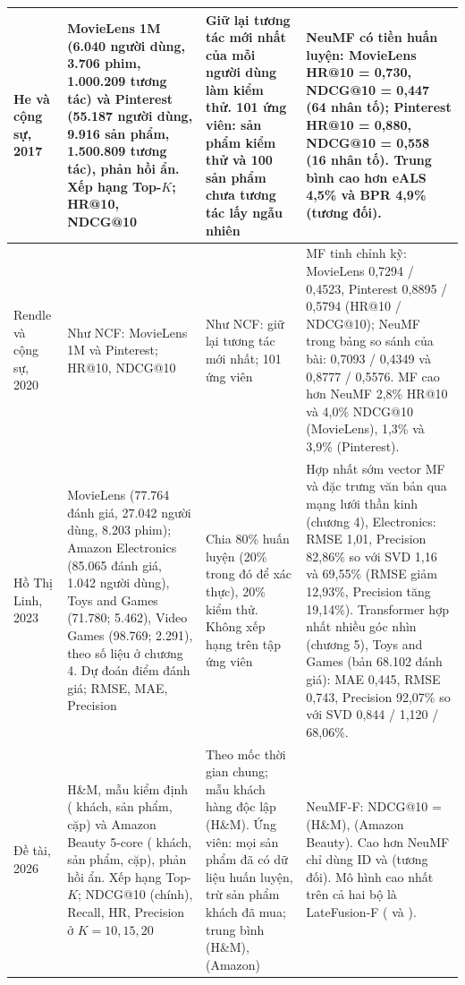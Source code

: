 \begin{xltabular}{\textwidth}{|>{\raggedright\arraybackslash}p{2.2cm}|>{\raggedright\arraybackslash}p{4.1cm}|>{\raggedright\arraybackslash}p{3.3cm}|>{\raggedright\arraybackslash}X|}
    \endfoot
    He và cộng sự, 2017 & MovieLens 1M (6.040 người dùng, 3.706 phim, 1.000.209 tương tác) và Pinterest (55.187 người dùng, 9.916 sản phẩm, 1.500.809 tương tác), phản hồi ẩn. Xếp hạng Top-$K$; HR@10, NDCG@10 & Giữ lại tương tác mới nhất của mỗi người dùng làm kiểm thử. 101 ứng viên: sản phẩm kiểm thử và 100 sản phẩm chưa tương tác lấy ngẫu nhiên & NeuMF có tiền huấn luyện: MovieLens HR@10 = 0,730, NDCG@10 = 0,447 (64 nhân tố); Pinterest HR@10 = 0,880, NDCG@10 = 0,558 (16 nhân tố). Trung bình cao hơn eALS 4,5\% và BPR 4,9\% (tương đối). \\
    \hline
    Rendle và cộng sự, 2020 & Như NCF: MovieLens 1M và Pinterest; HR@10, NDCG@10 & Như NCF: giữ lại tương tác mới nhất; 101 ứng viên & MF tinh chỉnh kỹ: MovieLens 0,7294 / 0,4523, Pinterest 0,8895 / 0,5794 (HR@10 / NDCG@10); NeuMF trong bảng so sánh của bài: 0,7093 / 0,4349 và 0,8777 / 0,5576. MF cao hơn NeuMF 2,8\% HR@10 và 4,0\% NDCG@10 (MovieLens), 1,3\% và 3,9\% (Pinterest). \\
    \hline
    Hồ Thị Linh, 2023 & MovieLens (77.764 đánh giá, 27.042 người dùng, 8.203 phim); Amazon Electronics (85.065 đánh giá, 1.042 người dùng), Toys and Games (71.780; 5.462), Video Games (98.769; 2.291), theo số liệu ở chương 4. Dự đoán điểm đánh giá; RMSE, MAE, Precision & Chia 80\% huấn luyện (20\% trong đó để xác thực), 20\% kiểm thử. Không xếp hạng trên tập ứng viên & Hợp nhất sớm vector MF và đặc trưng văn bản qua mạng lưới thần kinh (chương 4), Electronics: RMSE 1,01, Precision 82,86\% so với SVD 1,16 và 69,55\% (RMSE giảm 12,93\%, Precision tăng 19,14\%). Transformer hợp nhất nhiều góc nhìn (chương 5), Toys and Games (bản 68.102 đánh giá): MAE 0,445, RMSE 0,743, Precision 92,07\% so với SVD 0,844 / 1,120 / 68,06\%. \\
    \hline
    Đề tài, 2026 & H\&M, mẫu kiểm định ( khách,  sản phẩm,  cặp) và Amazon Beauty 5-core ( khách,  sản phẩm,  cặp), phản hồi ẩn. Xếp hạng Top-$K$; NDCG@10 (chính), Recall, HR, Precision ở $K = 10, 15, 20$ & Theo mốc thời gian chung; mẫu khách hàng độc lập (H\&M). Ứng viên: mọi sản phẩm đã có dữ liệu huấn luyện, trừ sản phẩm khách đã mua; trung bình  (H\&M),  (Amazon) & NeuMF-F: NDCG@10 =  (H\&M),  (Amazon Beauty). Cao hơn NeuMF chỉ dùng ID  và  (tương đối). Mô hình cao nhất trên cả hai bộ là LateFusion-F ( và ). \\ \hline
\end{xltabular}
\endgroup


